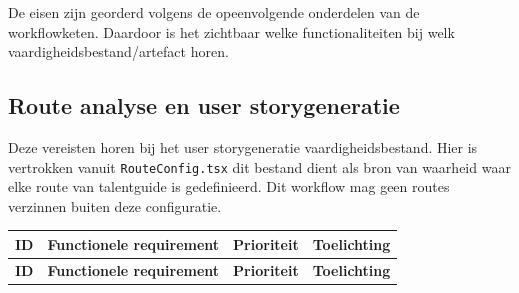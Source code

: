 De eisen zijn georderd volgens de opeenvolgende onderdelen van de workflowketen. Daardoor is het zichtbaar welke functionaliteiten bij welk vaardigheidsbestand/artefact horen. 

\subsection{Route analyse en user storygeneratie}
Deze vereisten horen bij het user storygeneratie vaardigheidsbestand. Hier is vertrokken vanuit \texttt{RouteConfig.tsx} dit bestand dient als bron van waarheid waar elke route van talentguide is gedefinieerd. Dit workflow mag geen routes verzinnen buiten deze configuratie.

\begin{longtable}{p{}p{}p{}p{}}
    \toprule
    \textbf{ID} & \textbf{Functionele requirement} & \textbf{Prioriteit} & \textbf{Toelichting} \\
    \midrule
    \endfirsthead
    
    \toprule
    \textbf{ID} & \textbf{Functionele requirement} & \textbf{Prioriteit} & \textbf{Toelichting} \\
    \midrule
    \endhead
    

\end{longtable}
